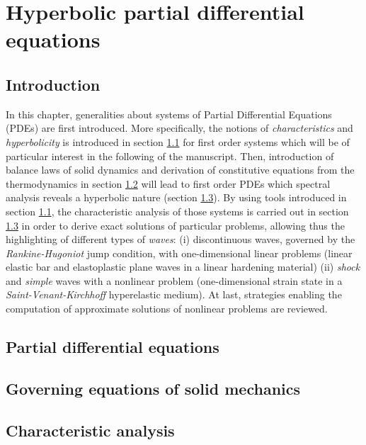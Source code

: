 \chapter{Hyperbolic partial differential equations}

\section*{Introduction}
In this chapter, generalities about systems of Partial Differential Equations (PDEs) are first introduced. More specifically, the notions of \textit{characteristics} and \textit{hyperbolicity} is introduced in section \ref{sec:PDEs} for first order systems which will be of particular interest in the following of the manuscript.
Then, introduction of balance laws of solid dynamics and derivation of constitutive equations from the thermodynamics in section \ref{sec:solidMech_equations} will lead to first order PDEs which spectral analysis reveals a hyperbolic nature (section \ref{sec:characteristic_analysis}). By using tools introduced in section \ref{sec:PDEs}, the characteristic analysis of those systems is carried out in section \ref{sec:characteristic_analysis} in order to derive exact solutions of particular problems, allowing thus the highlighting of different types of \textit{waves}: (i) discontinuous waves, governed by the \textit{Rankine-Hugoniot} jump condition, with one-dimensional linear problems (linear elastic bar and elastoplastic plane waves in a linear hardening material) (ii) \textit{shock} and \textit{simple} waves with a nonlinear problem (one-dimensional strain state in a \textit{Saint-Venant-Kirchhoff} hyperelastic medium). At last, strategies enabling the computation of approximate solutions of nonlinear problems are reviewed.


\section{Partial differential equations}
\label{sec:PDEs}


\section{Governing equations of solid mechanics}
\label{sec:solidMech_equations}



\section{Characteristic analysis}
\label{sec:characteristic_analysis}



